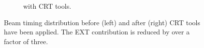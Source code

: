 \begin{figure}[ht]
\begin{center}
\begin{subfigure}[b]{0.4\textwidth}
    \caption{\label{fig:crt:post} with CRT tools.}
    \end{subfigure}
\caption{\label{fig:crt} Beam timing distribution before (left) and after (right) CRT tools have been applied. The EXT contribution is reduced by over a factor of three.}
\end{center}
\end{figure}
